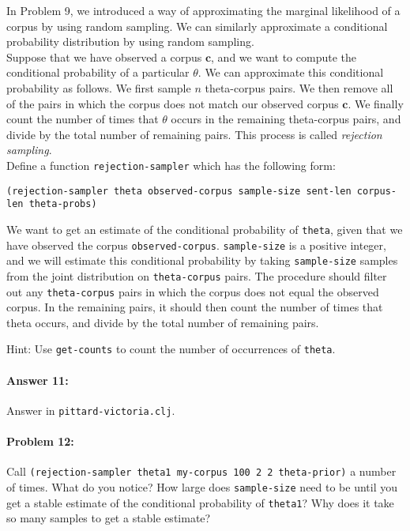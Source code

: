 \documentclass[10pt]{article}
\begin{document}
\noindent In Problem 9, we introduced a way of approximating the marginal
likelihood of a corpus by using random sampling. We can similarly
approximate a conditional probability distribution by using random
sampling.
\\

\noindent Suppose that we have observed a corpus $\mathbf{c}$, and we
want to compute the conditional probability of a particular
$\theta$. We can approximate this conditional probability as
follows. We first sample $n$ theta-corpus pairs. We then remove all of
the pairs in which the corpus does not match our observed corpus
$\mathbf{c}$. We finally count the number of times that $\theta$
occurs in the remaining theta-corpus pairs, and divide by the total
number of remaining pairs. This process is called \textit{rejection
  sampling}.
\\

\noindent 
Define a function \texttt{rejection-sampler} which has the following
form:
 
\begin{lstlisting}
(rejection-sampler theta observed-corpus sample-size sent-len corpus-len theta-probs)
\end{lstlisting}

\noindent We want to get an estimate of the conditional probability of
\texttt{theta}, given that we have observed the corpus
\texttt{observed-corpus}. \texttt{sample-size} is a positive integer,
and we will estimate this conditional probability by taking
\texttt{sample-size} samples from the joint distribution on
\texttt{theta-corpus} pairs. The procedure should filter out any
\texttt{theta-corpus} pairs in which the corpus does not equal the
observed corpus. In the remaining pairs, it should then count the
number of times that theta occurs, and divide by the total number of
remaining pairs.


\noindent Hint: Use \texttt{get-counts} to count the number of
occurrences of \texttt{theta}.

\paragraph{Answer 11:} Answer in
\texttt{pittard-victoria.clj}.

\paragraph{Problem 12:}

Call \texttt{(rejection-sampler theta1 my-corpus 100 2 2 theta-prior)}
a number of times. What do you notice? How large does
\texttt{sample-size} need to be until you get a stable estimate of the
conditional probability of \texttt{theta1}? Why does it take so many
samples to get a stable estimate?
\end{document}

